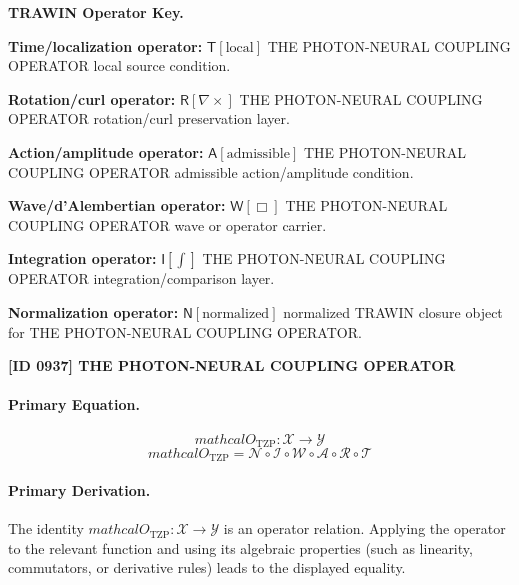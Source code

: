 \par\vspace{0.45\baselineskip}
\noindent\begin{minipage}[t]{\linewidth}
\begingroup
\small
\raggedright
\textbf{TRAWIN Operator Key.}\par
\noindent\textbf{Time/localization operator:} $\mathsf{T}\!\left[\mathrm{local}\right]$ THE PHOTON-NEURAL COUPLING OPERATOR local source condition.\par
\noindent\textbf{Rotation/curl operator:} $\mathsf{R}\!\left[\nabla\times\right]$ THE PHOTON-NEURAL COUPLING OPERATOR rotation/curl preservation layer.\par
\noindent\textbf{Action/amplitude operator:} $\mathsf{A}\!\left[\mathrm{admissible}\right]$ THE PHOTON-NEURAL COUPLING OPERATOR admissible action/amplitude condition.\par
\noindent\textbf{Wave/d'Alembertian operator:} $\mathsf{W}\!\left[\Box\right]$ THE PHOTON-NEURAL COUPLING OPERATOR wave or operator carrier.\par
\noindent\textbf{Integration operator:} $\mathsf{I}\!\left[\int\right]$ THE PHOTON-NEURAL COUPLING OPERATOR integration/comparison layer.\par
\noindent\textbf{Normalization operator:} $\mathsf{N}\!\left[\mathrm{normalized}\right]$ normalized TRAWIN closure object for THE PHOTON-NEURAL COUPLING OPERATOR.\par
\endgroup
\end{minipage}

\clearpage
\noindent\textbf{[ID 0937] THE PHOTON-NEURAL COUPLING OPERATOR}\par
\vspace{0.35em}
\paragraph{Primary Equation.}
\[
mathcal{O}_{\mathrm{TZP}} : \mathcal{X} \to \mathcal{Y}
\]
\[
mathcal{O}_{\mathrm{TZP}} = \mathcal{N}\circ \mathcal{I}\circ \mathcal{W}\circ \mathcal{A}\circ \mathcal{R}\circ \mathcal{T}
\]

\paragraph{Primary Derivation.}
The identity \( mathcal{O}_{\mathrm{TZP}} : \mathcal{X} \to \mathcal{Y} \) is an operator relation. Applying the operator to the relevant function and using its algebraic properties (such as linearity, commutators, or derivative rules) leads to the displayed equality.
